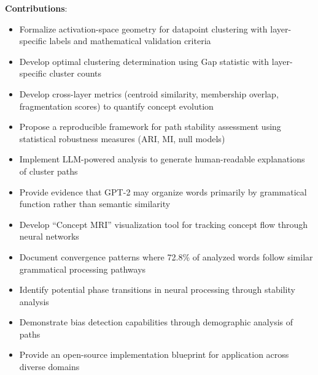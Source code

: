 \textbf{Contributions}:
\begin{itemize}
    \item Formalize activation-space geometry for datapoint clustering with layer-specific labels and mathematical validation criteria
    \item Develop optimal clustering determination using Gap statistic with layer-specific cluster counts
    \item Develop cross-layer metrics (centroid similarity, membership overlap, fragmentation scores) to quantify concept evolution
    \item Propose a reproducible framework for path stability assessment using statistical robustness measures (ARI, MI, null models)
    \item Implement LLM-powered analysis to generate human-readable explanations of cluster paths
    \item Provide evidence that GPT-2 may organize words primarily by grammatical function rather than semantic similarity
    \item Develop ``Concept MRI'' visualization tool for tracking concept flow through neural networks
    \item Document convergence patterns where 72.8\% of analyzed words follow similar grammatical processing pathways
    \item Identify potential phase transitions in neural processing through stability analysis
    \item Demonstrate bias detection capabilities through demographic analysis of paths
    \item Provide an open-source implementation blueprint for application across diverse domains
\end{itemize}